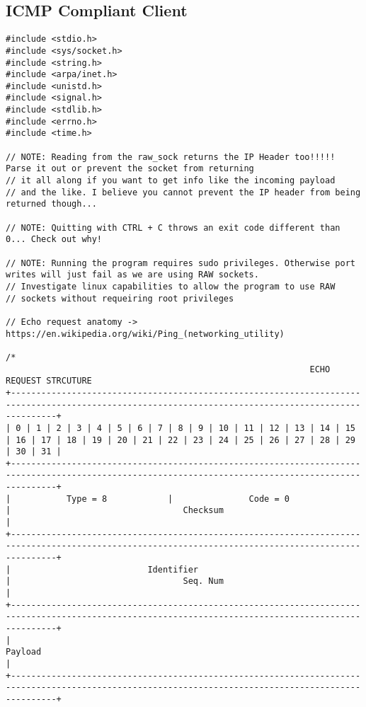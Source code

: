 \documentclass[landscape]{article}
\begin{document}
        \subsection{ICMP Compliant Client}
            \begin{verbatim}
#include <stdio.h>
#include <sys/socket.h>
#include <string.h>
#include <arpa/inet.h>
#include <unistd.h>
#include <signal.h>
#include <stdlib.h>
#include <errno.h>
#include <time.h>

// NOTE: Reading from the raw_sock returns the IP Header too!!!!! Parse it out or prevent the socket from returning
// it all along if you want to get info like the incoming payload
// and the like. I believe you cannot prevent the IP header from being returned though...

// NOTE: Quitting with CTRL + C throws an exit code different than 0... Check out why!

// NOTE: Running the program requires sudo privileges. Otherwise port writes will just fail as we are using RAW sockets.
// Investigate linux capabilities to allow the program to use RAW
// sockets without requeiring root privileges

// Echo request anatomy -> https://en.wikipedia.org/wiki/Ping_(networking_utility)

/*
                                                            ECHO REQUEST STRCUTURE
+-----------------------------------------------------------------------------------------------------------------------------------------------------+
| 0 | 1 | 2 | 3 | 4 | 5 | 6 | 7 | 8 | 9 | 10 | 11 | 12 | 13 | 14 | 15 | 16 | 17 | 18 | 19 | 20 | 21 | 22 | 23 | 24 | 25 | 26 | 27 | 28 | 29 | 30 | 31 |
+-----------------------------------------------------------------------------------------------------------------------------------------------------+
|           Type = 8            |               Code = 0              |                                  Checksum                                     |
+-----------------------------------------------------------------------------------------------------------------------------------------------------+
|                           Identifier                                |                                  Seq. Num                                     |
+-----------------------------------------------------------------------------------------------------------------------------------------------------+
|                                                                  Payload                                                                            |
+-----------------------------------------------------------------------------------------------------------------------------------------------------+


\end{verbatim}
\end{document}
